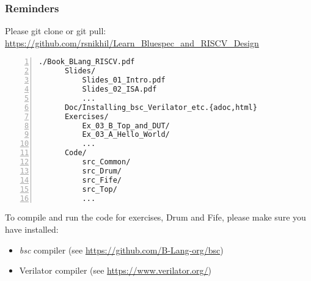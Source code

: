 \begin{frame}[fragile]
\frametitle{Reminders}

\footnotesize

Please git clone or git pull: \url{https://github.com/rsnikhil/Learn_Bluespec_and_RISCV_Design}

\begin{Verbatim}[frame=single, numbers=left]
    ./Book_BLang_RISCV.pdf
      Slides/
          Slides_01_Intro.pdf
          Slides_02_ISA.pdf
          ...
      Doc/Installing_bsc_Verilator_etc.{adoc,html}
      Exercises/
          Ex_03_B_Top_and_DUT/
          Ex_03_A_Hello_World/
          ...
      Code/
          src_Common/
          src_Drum/
          src_Fife/
          src_Top/
          ...
\end{Verbatim}

\vspace{1ex}

To compile and run the code for exercises, Drum and Fife, please make sure you have installed:

\begin{itemize}

 \item \emph{bsc} compiler (see \url{https://github.com/B-Lang-org/bsc})

 \item Verilator compiler (see \url{https://www.verilator.org/})
\end{itemize}

\footnotesize

\end{frame}
